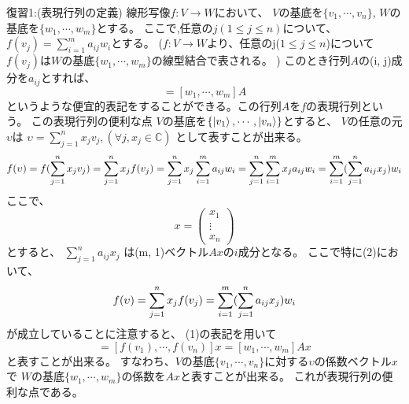 {\large 復習1:(表現行列の定義)}
\setcounter{equation}{0}
線形写像$f:V \to W$において、
$V$の基底を$\{v_1, \cdots, v_n\}$, $W$の基底を$\{w_1,\cdots, w_m\}$とする。
\newline
ここで,任意の$j (1\leq j\leq n)$について、
$f(v_j) = \sum_{i=1}^m a_{ij}w_i$とする。
\newline
($f:V \to W$より、任意のj($1\leq j\leq n$)について
$f(v_j)$は$W$の基底$\{w_1, \cdots, w_m\}$の線型結合で表される。
)
\newline
このとき行列$A$の(i, j)成分を$a_{ij}$とすれば、 
\begin{equation}
[f(v_1), \cdots, f(v_n)] = [w_1, \cdots, w_m]A
\end{equation}
というような便宜的表記をすることができる。この行列$A$を$f$の表現行列という。
\newline
 この表現行列の便利な点
\newline
$V$の基底を$\{\ket{v_1},\cdots, \ket{v_n}\}$とすると、 
$V$の任意の元$\upsilon$は
$\upsilon = \sum_{j=1}^n x_j v_j, (\forall j, x_j \in \mathbb{C})$
として表すことが出来る。
\newline
\begin{equation}
f(\upsilon) \newline
=f(\sum_{j=1}^n x_j v_j) \\ 
=\sum_{j=1}^n x_j f(v_j) \\
=\sum_{j=1}^n x_j \sum_{i=1}^m a_{ij}w_i \\
=\sum_{j=1}^n \sum_{i=1}^m x_j a_{ij}w_i \\
=\sum_{i=1}^m (\sum_{j=1}^n a_{ij} x_j)w_i
\end{equation}
ここで、
\[x = \left(
	\begin{array}{c}
	x_1 \\
	\vdots \\
	x_n
	\end{array}
	\right)
\]
とすると、
$\sum_{j=1}^n a_{ij} x_j$
は(m, 1)ベクトル$Ax$の$i$成分となる。
\newline
ここで特に(2)において、
\begin{equation}
f(\upsilon)
=\sum_{j=1}^n x_j f(v_j) \\
=\sum_{i=1}^m (\sum_{j=1}^n a_{ij} x_j)w_i
\end{equation}
が成立していることに注意すると、
(1)の表記を用いて
\begin{equation}
[f(\upsilon)]=[f(v_1), \cdots, f(v_n)]x
 = [w_1, \cdots, w_m]Ax
\end{equation}
と表すことが出来る。
すなわち、$V$の基底$\{v_1,\cdots, v_n\}$に対する$\upsilon$の係数ベクトル$x$
で $W$の基底$\{w_1,\cdots, w_m\}$の係数を$Ax$と表すことが出来る。
これが表現行列の便利な点である。
